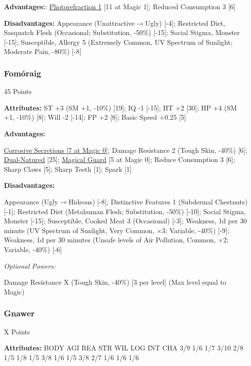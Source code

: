 \begin{multicols*}{3}
	\textbf{Advantages:}:
	\hyperref[photorefraction]{Photorefraction 1} [11 at Magic 1]; Reduced Consumption 3 [6]
	
	\textbf{Disadvantages:}	
	Appearance (Unattractive$\rightarrow$Ugly) [-4]; Restricted Diet, Sasquatch Flesh (Occasional; Substitution, -50\%) [-15]; Social Stigma, Monster [-15]; Susceptible, Allergy 5 (Extremely Common, UV Spectrum of Sunlight; Moderate Pain, -80\%) [-8] 
	
	\subsubsection{Fomóraig}\label{formoraig}
	\begin{flushright}
		45 Points
	\end{flushright}
	
	\textbf{Attributes:}
	ST +3 (SM +1, -10\%) [19]; IQ -1 [-15]; HT +2 [30]; HP +4 (SM +1, -10\%) [8]; Will -2 [-14]; FP +2 [8]; Basic Speed +0.25 [5]
	
	\textbf{Advantages:}

	\hyperref[corrosive_secretions]{Corrosive Secretions [7 at Magic 0]}; Damage Resistance 2 (Tough Skin, -40\%) [6]; \hyperref[dual_natured]{Dual-Natured} [25]; \hyperref[magical_guard]{Magical Guard} [5 at Magic 0]; Reduce Consumption 3 [6]; Sharp Claws [5]; Sharp Teeth [1]; Spark [1]
	
	\textbf{Disadvantages:}
	
	Appearance (Ugly$\rightarrow$Hideous) [-8]; Distinctive Features 1 (Subdermal Chestnuts) [-1]; Restricted Diet (Metahuman Flesh; Substitution, -50\%) [-10]; Social Stigma, Monster [-15]; Susceptible, Cooked Meat 3 (Occasional) [-3]; Weakness, 1d per 30 minute (UV Spectrum of Sunlight, Very Common, $\times$3; Variable, -40\%) [-9]; Weakness, 1d per 30 minutes (Unsafe levels of Air Pollution, Common, $\times$2; Variable, -40\%) [-6]
	
	\textit{Optional Powers:}
	
	Damage Resistance X (Tough Skin, -40\%) [3 per level] (Max level equal to Magic)
	
	\subsubsection{Gnawer}\label{gnawer}
	\begin{flushright}
		X Points
	\end{flushright}

	\textbf{Attributes:}
	BODY AGI REA STR WIL LOG INT CHA
	3/9	1/6	1/7	3/10 2/8 1/5 1/8 1/5
	3/8	1/6	1/5	3/8	2/7	1/6	1/6	1/6
	

\end{multicols*}
